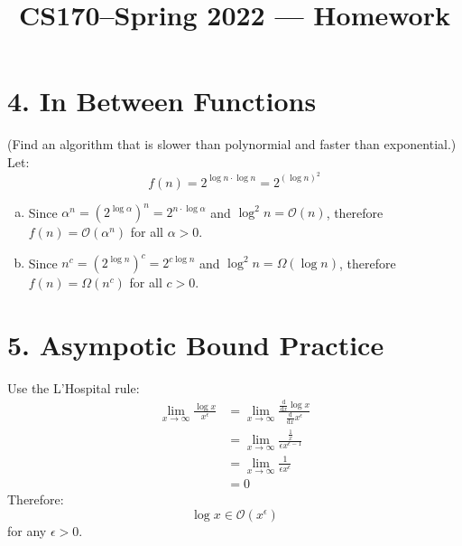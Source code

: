 \documentclass[11pt]{article}
\title{CS170--Spring 2022 --- Homework \Homework}
\author{\Name}
\date{}
\begin{document}
	\maketitle
	
	
	\section*{4. In Between Functions}
	(Find an algorithm that is slower than polynormial and faster than exponential.)\\
	Let:
	$$f(n) = 2^{\log n \cdot \log n} = 2^{(\log n)^2}$$
	\begin{enumerate}[(a)]
		\item 
		Since $\alpha^n = (2^{\log\alpha})^n = 2^{n\cdot \log\alpha}$ and $\log^2 n = \mathcal{O}(n)$, therefore $f(n) = \mathcal{O}(\alpha^n)$ for all $\alpha > 0$.
		
		\item 
		Since $n^c = (2^{\log n})^c = 2^{c\log n }$ and $\log^2 n = \Omega(\log n)$, therefore $f(n) = \Omega(n^c)$  for all $c > 0$.
		
		
	\end{enumerate}
	
	
	\vspace{1cm}
	
	\section*{5. Asympotic Bound Practice}
	Use the L'Hospital rule:
	\begin{align*}
		\lim_{x\to \infty}\frac{\log x}{x^\epsilon} 
		&= \lim_{x\to \infty} \frac{\frac{\mathrm{d}}{\mathrm{d}x}\log x}{\frac{\mathrm{d}}{\mathrm{d}x}x^{\epsilon}}\\
		&= \lim_{x\to \infty}\frac{\frac{1}{x}}{\epsilon x^{\epsilon - 1}}\\
		&= \lim_{x\to \infty}\frac{1}{\epsilon x^{\epsilon}}\\
		&= 0
	\end{align*}
	Therefore:
	$$\log x \in \mathcal{O}(x^{\epsilon})$$
	for any $\epsilon > 0$.
\end{document}
